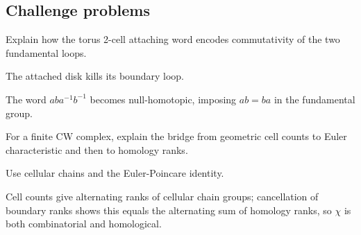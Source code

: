 \subsection*{Challenge problems}

\begin{exercise}\label{exr:viii06-ped-15}
Explain how the torus 2-cell attaching word encodes commutativity of the two fundamental loops.
\end{exercise}
\begin{hint}
The attached disk kills its boundary loop.
\end{hint}
\begin{solution}
The word $aba^{-1}b^{-1}$ becomes null-homotopic, imposing $ab=ba$ in the fundamental group.
\end{solution}

\begin{exercise}[CW synthesis]\label{exr:viii06-ped-16}
For a finite CW complex, explain the bridge from geometric cell counts to Euler characteristic and then to homology ranks.
\end{exercise}
\begin{hint}
Use cellular chains and the Euler-Poincare identity.
\end{hint}
\begin{solution}
Cell counts give alternating ranks of cellular chain groups; cancellation of boundary ranks shows this equals the alternating sum of homology ranks, so $\chi$ is both combinatorial and homological.
\end{solution}

